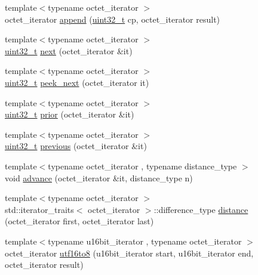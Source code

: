 \begin{DoxyCompactItemize}
\item 
{\footnotesize template$<$typename octet\+\_\+iterator $>$ }\\octet\+\_\+iterator \hyperlink{namespaceutf8_1_1unchecked_acab3a56b1772ed871f36757883d63788}{append} (\hyperlink{namespaceutf8_a846259d2f173d524282583fc9d825b00}{uint32\+\_\+t} cp, octet\+\_\+iterator result)
\item 
{\footnotesize template$<$typename octet\+\_\+iterator $>$ }\\\hyperlink{namespaceutf8_a846259d2f173d524282583fc9d825b00}{uint32\+\_\+t} \hyperlink{namespaceutf8_1_1unchecked_ac5932c0cbb2498a111d53d26fd82f260}{next} (octet\+\_\+iterator \&it)
\item 
{\footnotesize template$<$typename octet\+\_\+iterator $>$ }\\\hyperlink{namespaceutf8_a846259d2f173d524282583fc9d825b00}{uint32\+\_\+t} \hyperlink{namespaceutf8_1_1unchecked_aaf5ddbe24f8dbb83390e2d33d75b9ea1}{peek\+\_\+next} (octet\+\_\+iterator it)
\item 
{\footnotesize template$<$typename octet\+\_\+iterator $>$ }\\\hyperlink{namespaceutf8_a846259d2f173d524282583fc9d825b00}{uint32\+\_\+t} \hyperlink{namespaceutf8_1_1unchecked_ad2c0e4b9693713ac18ee543e214b3ef9}{prior} (octet\+\_\+iterator \&it)
\item 
{\footnotesize template$<$typename octet\+\_\+iterator $>$ }\\\hyperlink{namespaceutf8_a846259d2f173d524282583fc9d825b00}{uint32\+\_\+t} \hyperlink{namespaceutf8_1_1unchecked_a454cdd8f6b6771bd0425be1ccd94f788}{previous} (octet\+\_\+iterator \&it)
\item 
{\footnotesize template$<$typename octet\+\_\+iterator , typename distance\+\_\+type $>$ }\\void \hyperlink{namespaceutf8_1_1unchecked_a66ea3b93a81a8f961e7a1700d13efc57}{advance} (octet\+\_\+iterator \&it, distance\+\_\+type n)
\item 
{\footnotesize template$<$typename octet\+\_\+iterator $>$ }\\std\+::iterator\+\_\+traits$<$ octet\+\_\+iterator $>$\+::difference\+\_\+type \hyperlink{namespaceutf8_1_1unchecked_a3796d7a15edc244a872a9ca559ea2693}{distance} (octet\+\_\+iterator first, octet\+\_\+iterator last)
\item 
{\footnotesize template$<$typename u16bit\+\_\+iterator , typename octet\+\_\+iterator $>$ }\\octet\+\_\+iterator \hyperlink{namespaceutf8_1_1unchecked_adfbd29a875d0aafeeaae511dc1aa5d77}{utf16to8} (u16bit\+\_\+iterator start, u16bit\+\_\+iterator end, octet\+\_\+iterator result)

\end{DoxyCompactItemize}
